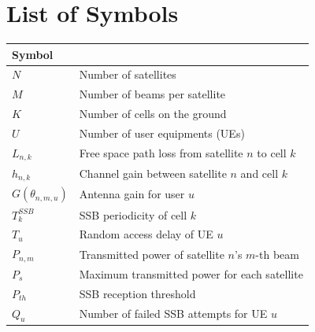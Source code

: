 \section{List of Symbols}
\begin{tabular}{ll}
\hline
\multicolumn{2}{l}{\textbf{Symbol}} \\
\hline
$N$ & Number of satellites \\
$M$ & Number of beams per satellite \\
$K$ & Number of cells on the ground \\
$U$ & Number of user equipments (UEs) \\
$L_{n,k}$ & Free space path loss from satellite $n$ to cell $k$ \\
$h_{n,k}$ & Channel gain between satellite $n$ and cell $k$ \\
$G(\theta_{n,m,u})$ & Antenna gain for user $u$ \\
$T^{SSB}_k$ & SSB periodicity of cell $k$ \\
$T_u$ & Random access delay of UE $u$ \\
$P_{n,m}$ & Transmitted power of satellite $n$'s $m$-th beam \\
$P_s$ & Maximum transmitted power for each satellite \\
$P_{th}$ & SSB reception threshold \\
$Q_u$ & Number of failed SSB attempts for UE $u$ \\
\end{tabular}

